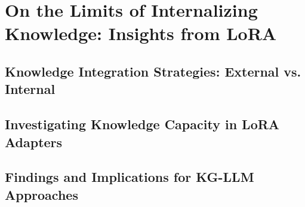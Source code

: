 \chapter{On the Limits of Internalizing Knowledge: Insights from LoRA}
\label{chap:lora_limits}


\section{Knowledge Integration Strategies: External vs. Internal}
\label{sec:lora_external_vs_internal}


\section{Investigating Knowledge Capacity in LoRA Adapters}
\label{sec:lora_capacity_investigation}


\section{Findings and Implications for KG-LLM Approaches}
\label{sec:lora_implications}

